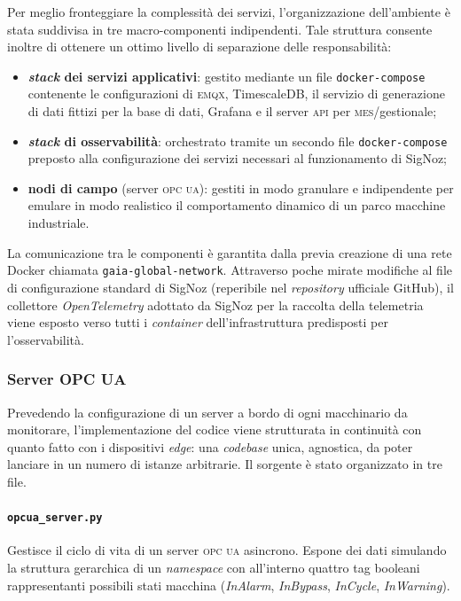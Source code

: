 \documentclass[12pt]{article}
\begin{document}
    Per meglio fronteggiare la complessità dei servizi, l'organizzazione dell'ambiente è stata suddivisa in tre macro-componenti indipendenti. Tale struttura consente inoltre di ottenere un ottimo livello di separazione delle responsabilità:
    \begin{itemize}
        \item \textbf{\textit{stack} dei servizi applicativi}: gestito mediante un file \texttt{docker-compose} contenente le configurazioni di \textsc{emqx}, TimescaleDB, il servizio di generazione di dati fittizi per la base di dati, Grafana e il server \textsc{api} per \textsc{mes}/gestionale;
        \item \textbf{\textit{stack} di osservabilità}: orchestrato tramite un secondo file \texttt{docker-compose} preposto alla configurazione dei servizi necessari al funzionamento di SigNoz;
        \item \textbf{nodi di campo} (server \textsc{opc ua}): gestiti in modo granulare e indipendente per emulare in modo realistico il comportamento dinamico di un parco macchine industriale.
    \end{itemize}
    La comunicazione tra le componenti è garantita dalla previa creazione di una rete Docker chiamata \verb|gaia-global-network|. Attraverso poche mirate modifiche al file di configurazione standard di SigNoz (reperibile nel \textit{repository} ufficiale GitHub), il collettore \textit{OpenTelemetry} adottato da SigNoz per la raccolta della telemetria viene esposto verso tutti i \textit{container} dell'infrastruttura predisposti per l'osservabilità.
    
    \subsubsection{Server OPC UA}
    Prevedendo la configurazione di un server a bordo di ogni macchinario da monitorare, l'implementazione del codice viene strutturata in continuità con quanto fatto con i dispositivi \textit{edge}: una \textit{codebase} unica, agnostica, da poter lanciare in un numero di istanze arbitrarie.
    Il sorgente è stato organizzato in tre file.

    \paragraph{\texttt{opcua\_server.py}} Gestisce il ciclo di vita di un server \textsc{opc ua} asincrono. Espone dei dati simulando la struttura gerarchica di un \textit{namespace} con all'interno quattro tag booleani rappresentanti possibili stati macchina (\textit{InAlarm}, \textit{InBypass}, \textit{InCycle}, \textit{InWarning}).
\end{document}
